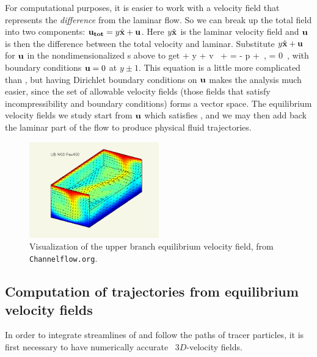 \documentclass[letter,12pt,openany]{article}
\begin{document}
For computational purposes, it is easier to work with a velocity field  that
represents the {\em difference} from the laminar flow. 
So we can break up the total field into two components: ${\bf u_{tot}} =
y \hat{\bf x} + {\bf u}$. Here $y \hat{\bf x}$ is the laminar velocity
field and ${\bf u}$ is then the difference between the total velocity and
laminar. Substitute $y \hat{\bf x} + {\bf u}$ for ${\bf u}$ in the
nondimensionalized {\NSe}s above to get
\beq
    + y  
    + v \, 
    + \bu \cdot \bnabla \bu
=
    - \bnabla p
    + 
        \lapl \bu  \,, \quad \nabla \cdot \bu = 0
\,,
with boundary conditions ${\bf u} = 0 $ at $y \pm 1$.  This equation is 
a little more complicated than , but having 
Dirichlet boundary conditions on ${\bf u}$ makes the analysis much easier, 
since the set of allowable velocity fields (those fields that satisfy 
incompressibility and boundary conditions) forms a vector space. The equilibrium 
velocity fields we study start from ${\bf u}$ which satisfies , and we may then add back the laminar part of the flow to produce physical fluid trajectories. 

\begin{figure}[!h]
 \begin{center} 
\includegraphics[width=0.5\textwidth]{figs/eq2.png}
  \caption{
Visualization of the upper branch equilibrium velocity field, from {\tt 
Channelflow.org}. 
   }
  \label{fig:UB}
  \end{center}
 \end{figure}



\subsection {\bf Computation of trajectories from equilibrium velocity fields}
\label{s:channelflow}

 In order to integrate streamlines of {\pCf}
and follow the paths of tracer particles, it is first
necessary to have numerically accurate \eqv\ $3D$-velocity fields.
\end{document}
